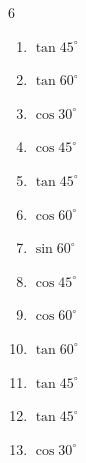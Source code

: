 \begin{multicols}{6}
\begin{enumerate}
  \item $\displaystyle \tan{45^\circ}$

        \phantom{$\displaystyle =1$}

  \item $\displaystyle \tan{60^\circ}$


  \item $\displaystyle \cos{30^\circ}$


  \item $\displaystyle \cos{45^\circ}$


  \item $\displaystyle \tan{45^\circ}$

        \phantom{$\displaystyle =1$}

  \item $\displaystyle \cos{60^\circ}$


  \item $\displaystyle \sin{60^\circ}$


\columnbreak %

  \item $\displaystyle \cos{45^\circ}$


  \item $\displaystyle \cos{60^\circ}$


  \item $\displaystyle \tan{60^\circ}$


  \item $\displaystyle \tan{45^\circ}$

        \phantom{$\displaystyle =1$}

  \item $\displaystyle \tan{45^\circ}$

        \phantom{$\displaystyle =1$}

  \item $\displaystyle \cos{30^\circ}$


\end{enumerate}
\end{multicols}
